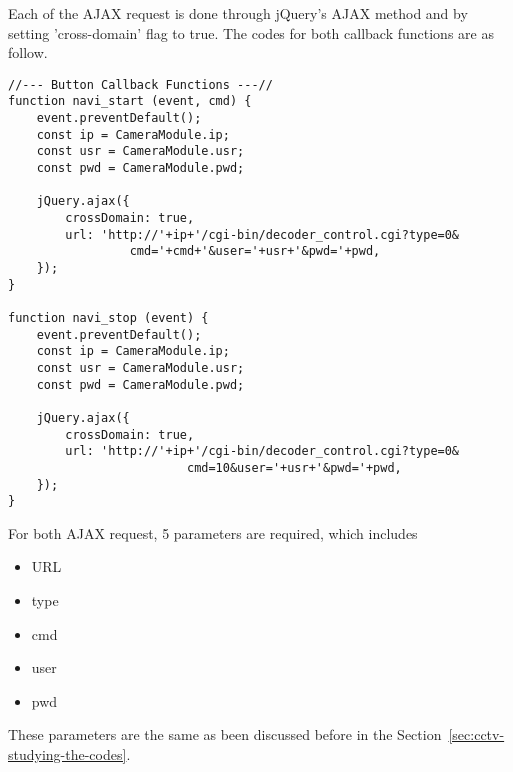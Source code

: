 Each of the AJAX request is done through jQuery's AJAX method and by setting 'cross-domain' flag to true. The codes for both callback functions are as follow.

\begin{lstlisting}
//--- Button Callback Functions ---//
function navi_start (event, cmd) {
	event.preventDefault();
	const ip = CameraModule.ip;
	const usr = CameraModule.usr;
	const pwd = CameraModule.pwd;
	
	jQuery.ajax({
		crossDomain: true,
		url: 'http://'+ip+'/cgi-bin/decoder_control.cgi?type=0&
		         cmd='+cmd+'&user='+usr+'&pwd='+pwd,
	});
}

function navi_stop (event) {
	event.preventDefault();
	const ip = CameraModule.ip;
	const usr = CameraModule.usr;
	const pwd = CameraModule.pwd;
	
	jQuery.ajax({
		crossDomain: true,
		url: 'http://'+ip+'/cgi-bin/decoder_control.cgi?type=0&
                         cmd=10&user='+usr+'&pwd='+pwd,
	});
}
\end{lstlisting}

For both AJAX request, 5 parameters are required, which includes
\begin{itemize}
\item URL
\item type
\item cmd
\item user
\item pwd
\end{itemize}
These parameters are the same as been discussed before in the Section~\ref{sec:cctv-studying-the-codes}.